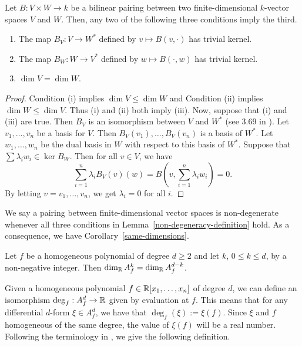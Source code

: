 \documentclass{puthesis-UG}
\begin{document}
\begin{lem} \label{non-degeneracy-definition}
	Let $B : V \times W \to k$ be a bilinear pairing between two finite-dimensional $k$-vector spaces $V$ and $W$. Then, any two of the following three conditions imply the third. 
		\begin{enumerate}[label = (\roman*)]
			\item The map $B_V : V \to W^*$ defined by $v \mapsto B(v, \cdot)$ has trivial kernel.
			\item The map $B_W : W \to V^*$ defined by $w \mapsto B(\cdot, w)$ has trivial kernel. 
			\item $\dim V = \dim W$. 
		\end{enumerate}
	\end{lem}

	\begin{proof}
		Condition (i) implies $\dim V \leq \dim W$ and Condition (ii) implies $\dim W \leq \dim V$. Thus (i) and (ii) both imply (iii). Now, suppose that (i) and (iii) are true. Then $B_V$ is an isomorphism between $V$ and $W^*$ (see 3.69 in \cite{axler}). Let $v_1, \ldots, v_n$ be a basis for $V$. Then $B_V(v_1), \ldots, B_V(v_n)$ is a basis of $W^*$. Let $w_1, \ldots, w_n$ be the dual basis in $W$ with respect to this basis of $W^*$. Suppose that $\sum \lambda_i w_i \in \ker B_W$. Then for all $v \in V$, we have 
		\[
			\sum_{i = 1}^n \lambda_i B_V(v)(w) = B \left ( v, \sum_{i = 1}^n \lambda_i w_i \right ) = 0. 
		\]
		By letting $v = v_1, \ldots, v_n$, we get $\lambda_i = 0$ for all $i$. 
	\end{proof}

We say a pairing between finite-dimensional vector spaces is non-degenerate whenever all three conditions in Lemma~\ref{non-degeneracy-definition} hold. As a consequence, we have Corollary~\ref{same-dimensions}.

\begin{cor} \label{same-dimensions}
	Let $f$ be a homogeneous polynomial of degree $d \geq 2$ and let $k$, $0 \leq k \leq d$, by a non-negative integer. Then $\dim_{\mathbb{R}} A_f^k = \dim_{\mathbb{R}} A_f^{d-k}$. 
\end{cor}

Given a homogeneous polynomial $f \in \mathbb{R}[x_1, \ldots, x_n]$ of degree $d$, we can define an isomorphism $\deg_f : A_f^d \to \mathbb{R}$ given by evaluation at $f$. This means that for any differential $d$-form $\xi \in A_f^d$, we have that $\deg_f (\xi) := \xi(f)$. Since $\xi$ and $f$ homogeneous of the same degree, the value of $\xi(f)$ will be a real number. Following the terminology in \cite{AHK}, we give the following definition. 
\end{document}
